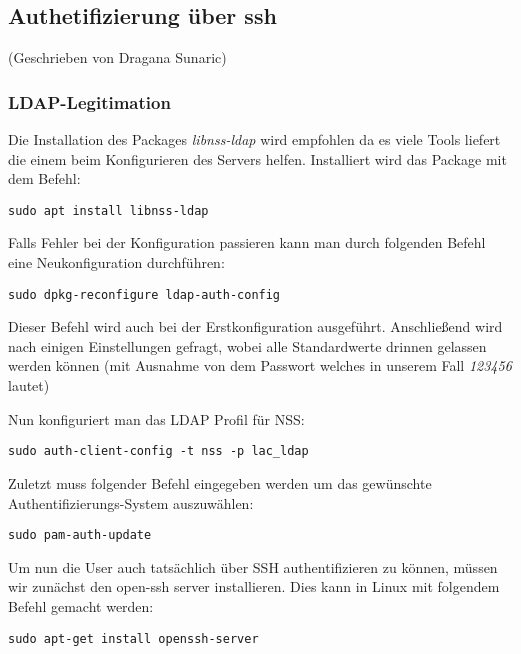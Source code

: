 \subsection{Authetifizierung über ssh}
(Geschrieben von Dragana Sunaric)

\subsubsection{LDAP-Legitimation}
Die Installation des Packages \textit{libnss-ldap} wird empfohlen da es viele Tools liefert die einem beim Konfigurieren des Servers helfen. Installiert wird das Package mit dem Befehl:

\verb|sudo apt install libnss-ldap|

Falls Fehler bei der Konfiguration passieren kann man durch folgenden Befehl eine Neukonfiguration durchführen:

\verb|sudo dpkg-reconfigure ldap-auth-config|

Dieser Befehl wird auch bei der Erstkonfiguration ausgeführt. Anschließend wird nach einigen Einstellungen gefragt, wobei alle Standardwerte drinnen gelassen werden können (mit Ausnahme von dem Passwort welches in unserem Fall \textit{123456} lautet) 

Nun konfiguriert man das LDAP Profil für NSS:

\verb|sudo auth-client-config -t nss -p lac_ldap|

Zuletzt muss folgender Befehl eingegeben werden um das gewünschte Authentifizierungs-System auszuwählen:

\verb|sudo pam-auth-update|

Um nun die User auch tatsächlich über SSH authentifizieren zu können, müssen wir zunächst den open-ssh server installieren. Dies kann in Linux mit folgendem Befehl gemacht werden:

\verb|sudo apt-get install openssh-server|

